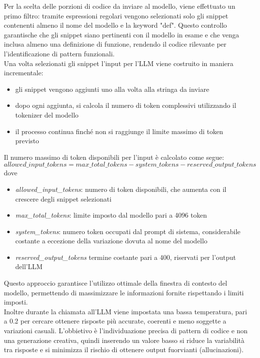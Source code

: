\documentclass{article}
\begin{document}
\begin{itemize}
Per la scelta delle porzioni di codice da inviare al modello, viene effettuato un primo filtro: tramite espressioni regolari vengono selezionati solo gli snippet contenenti almeno il nome del modello e la keyword "def". Questo controllo garantische che gli snippet siano pertinenti con il modello in esame e che venga inclusa almeno una definizione di funzione, rendendo il codice rilevante per l'identificazione di pattern funzionali.\\
Una volta selezionati gli snippet l'input per l'LLM viene costruito in maniera incrementale:
\begin{itemize}
    \item gli snippet vengono aggiunti uno alla volta alla stringa da inviare
    \item dopo ogni aggiunta, si calcola il numero di token complessivi utilizzando il tokenizer del modello
    \item il processo continua finché non si raggiunge il limite massimo di token previsto
\end{itemize}
Il numero massimo di token disponibili per l’input è calcolato come segue:
\[
allowed\_input\_tokens = max\_total\_tokens - system\_tokens - reserved\_output\_tokens
\]
dove
\begin{itemize}
    \item \textit{allowed\_input\_tokens}: numero di token disponibili, che aumenta con il crescere degli snippet selezionati
    \item \textit{max\_total\_tokens}: limite imposto dal modello pari a 4096 token
    \item \textit{system\_tokens}: numero token occupati dal prompt di sistema, considerabile costante a eccezione della variazione dovuta al nome del modello
    \item \textit{reserved\_output\_tokens} termine costante pari a 400,  riservati per l’output dell’LLM
\end{itemize}
Questo approccio garantisce l'utilizzo ottimale della finestra di contesto del modello, permettendo di massimizzare le informazioni fornite rispettando i limiti imposti.\\
Inoltre durante la chiamata all'LLM viene impostata una bassa temperatura, pari a 0.2 per cercare ottenere risposte più accurate, coerenti e meno soggette a variazioni casuali. L'obbietivo è l’individuazione precisa di pattern di codice e non una generazione creativa, quindi inserendo un valore basso si riduce la variabilità tra risposte e si minimizza il rischio di ottenere output fuorvianti (allucinazioni).\\

\end{itemize}
\end{document}
